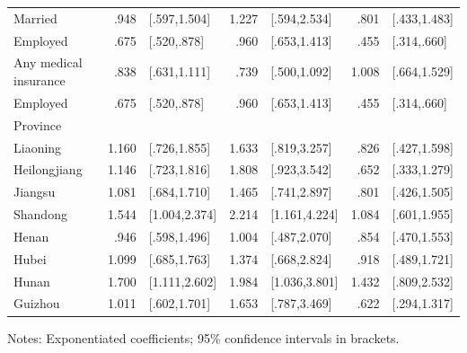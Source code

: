 \begin{table}[h]
\begin{adjustbox}{max width=\textwidth, center}
\begin{threeparttable}
{\begin{tabular}{l*{3}{D{.}{.}{-1}l}}
Married         &     .948&    [.597,1.504]&    1.227&    [.594,2.534]&     .801&    [.433,1.483]\\
Employed           &     .675&     [.520,.878]&     .960&    [.653,1.413]&     .455&     [.314,.660]\\
Any medical insurance&     .838&    [.631,1.111]&     .739&    [.500,1.092]&    1.008&    [.664,1.529]\\
Employed           &     .675&     [.520,.878]&     .960&    [.653,1.413]&     .455&     [.314,.660]\\
Province&&&&&&\\
\hspace*{10mm}Liaoning        &    1.160&    [.726,1.855]&    1.633&    [.819,3.257]&     .826&    [.427,1.598]\\
\hspace*{10mm}Heilongjiang    &    1.146&    [.723,1.816]&    1.808&    [.923,3.542]&     .652&    [.333,1.279]\\
\hspace*{10mm}Jiangsu         &    1.081&    [.684,1.710]&    1.465&    [.741,2.897]&     .801&    [.426,1.505]\\
\hspace*{10mm}Shandong        &    1.544&   [1.004,2.374]&    2.214&   [1.161,4.224]&    1.084&    [.601,1.955]\\
\hspace*{10mm}Henan           &     .946&    [.598,1.496]&    1.004&    [.487,2.070]&     .854&    [.470,1.553]\\
\hspace*{10mm}Hubei           &    1.099&    [.685,1.763]&    1.374&    [.668,2.824]&     .918&    [.489,1.721]\\
\hspace*{10mm}Hunan           &    1.700&   [1.111,2.602]&    1.984&   [1.036,3.801]&    1.432&    [.809,2.532]\\
\hspace*{10mm}Guizhou         &    1.011&    [.602,1.701]&    1.653&    [.787,3.469]&     .622&    [.294,1.317]\\
\bottomrule
\end{tabular}
\begin{tablenotes}
\item Notes: Exponentiated coefficients; 95\% confidence intervals in brackets.
\end{tablenotes}
}
\end{threeparttable}
\end{adjustbox}
\end{table}


